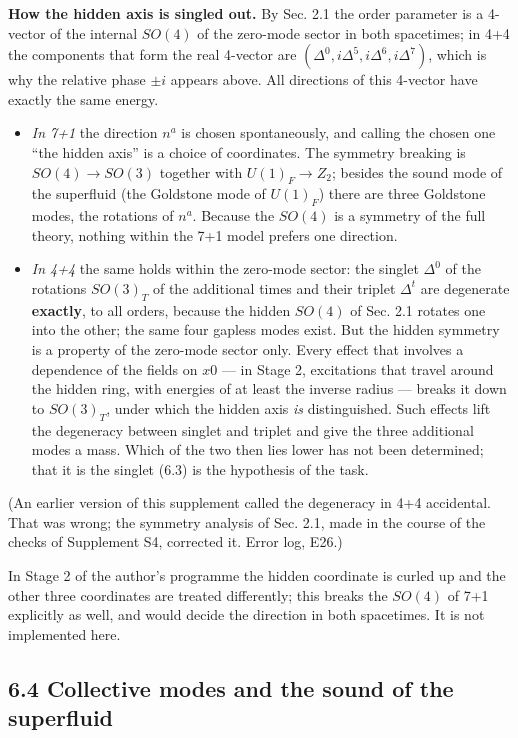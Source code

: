 \documentclass[
  10pt,
]{article}
\providecommand{\tightlist}{%
  \setlength{\itemsep}{0pt}\setlength{\parskip}{0pt}}
\begin{document}
\textbf{How the hidden axis is singled out.} By Sec. 2.1 the order
parameter is a 4-vector of the internal \(SO(4)\) of the zero-mode
sector in both spacetimes; in 4+4 the components that form the real
4-vector are \((\Delta^0,i\Delta^5,i\Delta^6,i\Delta^7)\), which is why
the relative phase \(\pm i\) appears above. All directions of this
4-vector have exactly the same energy.

\begin{itemize}
\tightlist
\item
  \emph{In 7+1} the direction \(n^a\) is chosen spontaneously, and
  calling the chosen one ``the hidden axis'' is a choice of coordinates.
  The symmetry breaking is \(SO(4)\to SO(3)\) together with
  \(U(1)_F\to Z_2\); besides the sound mode of the superfluid (the
  Goldstone mode of \(U(1)_F\)) there are three Goldstone modes, the
  rotations of \(n^a\). Because the \(SO(4)\) is a symmetry of the full
  theory, nothing within the 7+1 model prefers one direction.
\item
  \emph{In 4+4} the same holds within the zero-mode sector: the singlet
  \(\Delta^0\) of the rotations \(SO(3)_T\) of the additional times and
  their triplet \(\Delta^t\) are degenerate \textbf{exactly}, to all
  orders, because the hidden \(SO(4)\) of Sec. 2.1 rotates one into the
  other; the same four gapless modes exist. But the hidden symmetry is a
  property of the zero-mode sector only. Every effect that involves a
  dependence of the fields on \(x0\) --- in Stage 2, excitations that
  travel around the hidden ring, with energies of at least the inverse
  radius --- breaks it down to \(SO(3)_T\), under which the hidden axis
  \emph{is} distinguished. Such effects lift the degeneracy between
  singlet and triplet and give the three additional modes a mass. Which
  of the two then lies lower has not been determined; that it is the
  singlet (6.3) is the hypothesis of the task.
\end{itemize}

(An earlier version of this supplement called the degeneracy in 4+4
accidental. That was wrong; the symmetry analysis of Sec. 2.1, made in
the course of the checks of Supplement S4, corrected it. Error log,
E26.)

In Stage 2 of the author's programme the hidden coordinate is curled up
and the other three coordinates are treated differently; this breaks the
\(SO(4)\) of 7+1 explicitly as well, and would decide the direction in
both spacetimes. It is not implemented here.

\hypertarget{collective-modes-and-the-sound-of-the-superfluid}{%
\subsection{6.4 Collective modes and the sound of the
superfluid}\label{collective-modes-and-the-sound-of-the-superfluid}}
\end{document}
